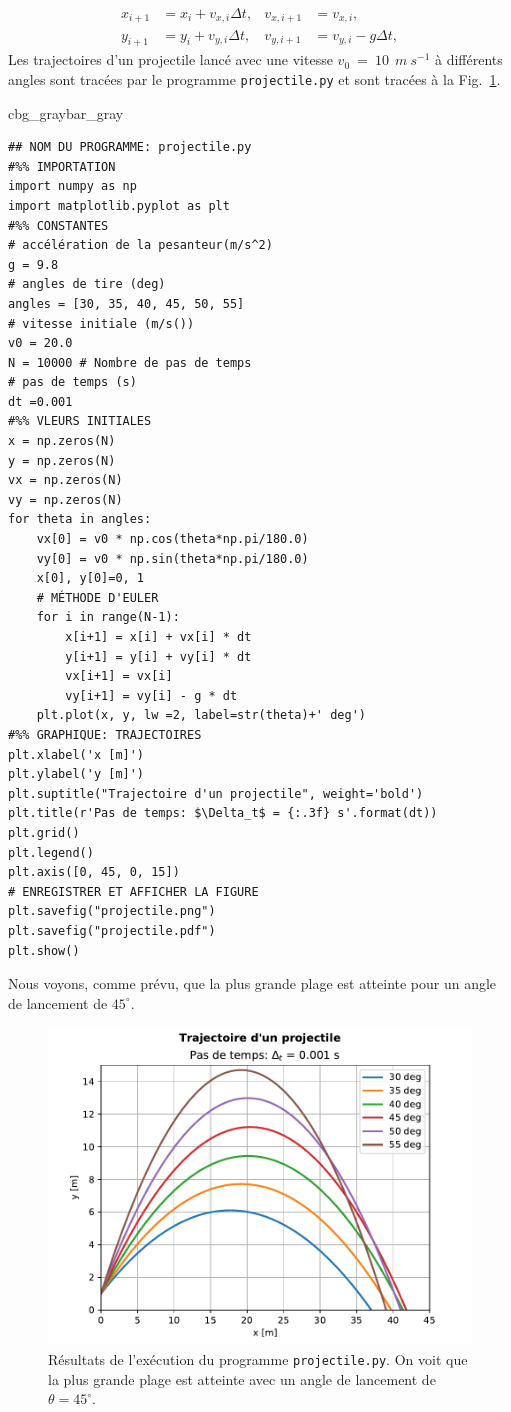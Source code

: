 \documentclass[%
oneside,                 %
final,                   %
10pt]{article}
\newenvironment{_pro_tight}[2]{
   \def\FrameCommand{\color{#2}\vrule width 1mm\normalcolor\colorbox{#1}}
   \FrameRule0.6pt\MakeFramed {\advance\hsize-2mm\FrameRestore}\vskip3mm}
   {\vskip0mm\endMakeFramed}
\newenvironment{pro}[2]{
\bgroup\rmfamily
\fboxsep=0mm\relax
\begin{_pro_tight}{#1}{#2}
\list{}{\parsep=-2mm\parskip=0mm\topsep=0pt\leftmargin=2mm
\rightmargin=2\leftmargin\leftmargin=4pt\relax}
\item\relax}
{\endlist\end{_pro_tight}\egroup}
\begin{document}
\begin{align}
x_{i+1} &  =x_i + v_{x,i} \Delta t, &  v_{x,i+1} &= v_{x,i}, \\
y_{i+1} &  =y_i + v_{y,i} \Delta t, &  v_{y,i+1} &= v_{y,i} - g \Delta t,
\end{align}
Les trajectoires d'un projectile lancé avec une vitesse $v_0~=~10~ \ m~s^{-1}$ à différents angles sont tracées par le programme \texttt{projectile.py} et sont tracées à la Fig.~\ref{fig:projectile}.
\begin{pro}{cbg_gray}{bar_gray}\begin{verbatim}
## NOM DU PROGRAMME: projectile.py
#%% IMPORTATION
import numpy as np
import matplotlib.pyplot as plt
#%% CONSTANTES
# accélération de la pesanteur(m/s^2)
g = 9.8
# angles de tire (deg)
angles = [30, 35, 40, 45, 50, 55]
# vitesse initiale (m/s())
v0 = 20.0 
N = 10000 # Nombre de pas de temps
# pas de temps (s)
dt =0.001
#%% VLEURS INITIALES
x = np.zeros(N)
y = np.zeros(N)
vx = np.zeros(N)
vy = np.zeros(N)
for theta in angles:
    vx[0] = v0 * np.cos(theta*np.pi/180.0)
    vy[0] = v0 * np.sin(theta*np.pi/180.0)
    x[0], y[0]=0, 1
    # MÉTHODE D'EULER
    for i in range(N-1):
        x[i+1] = x[i] + vx[i] * dt
        y[i+1] = y[i] + vy[i] * dt
        vx[i+1] = vx[i]
        vy[i+1] = vy[i] - g * dt
    plt.plot(x, y, lw =2, label=str(theta)+' deg')
#%% GRAPHIQUE: TRAJECTOIRES
plt.xlabel('x [m]')
plt.ylabel('y [m]')
plt.suptitle("Trajectoire d'un projectile", weight='bold')
plt.title(r'Pas de temps: $\Delta_t$ = {:.3f} s'.format(dt))
plt.grid()
plt.legend()
plt.axis([0, 45, 0, 15])
# ENREGISTRER ET AFFICHER LA FIGURE
plt.savefig("projectile.png")
plt.savefig("projectile.pdf")
plt.show()
\end{verbatim}
\end{pro}
\noindent
Nous voyons, comme prévu, que la plus grande plage est atteinte pour un angle de lancement de $45^\circ$.


\begin{figure}[!ht]  %
  \centerline{\includegraphics[width=0.7\linewidth]{scripts/projectile.pdf}}
  \caption{
  Résultats de l'exécution du programme \texttt{projectile.py}. On voit que la plus grande plage est atteinte avec un angle de lancement de $\theta = 45^\circ$. \label{fig:projectile}
  }
\end{figure}
\end{document}
